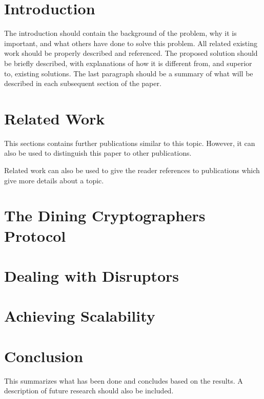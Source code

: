 \section{Introduction}

The introduction should contain the background of the problem, why it is important, and what others have done to solve this problem. All related existing work should be properly described and referenced. The proposed solution should be briefly described, with explanations of how it is different from, and superior to, existing solutions. The last paragraph should be a summary of what will be described in each subsequent section of the paper.
\cite{waidner1989dining}

\section{Related Work}

This sections contains further publications similar to this topic. However, it can also be used to distinguish this paper to other publications.

Related work can also be used to give the reader references to publications which give more details about a topic.

\section{The Dining Cryptographers Protocol}
\section{Dealing with Disruptors}
\section{Achieving Scalability}

\section{Conclusion}

This summarizes what has been done and concludes based on the results. A description of future research should also be included.
